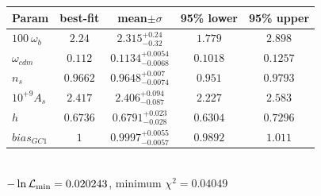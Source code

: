 \begin{tabular}{|l|c|c|c|c|} 
 \hline 
Param & best-fit & mean$\pm\sigma$ & 95\% lower & 95\% upper \\ \hline 
$100~\omega{}_{b }$ &$2.24$ & $2.315_{-0.32}^{+0.24}$ & $1.779$ & $2.898$ \\ 
$\omega{}_{cdm }$ &$0.112$ & $0.1134_{-0.0068}^{+0.0054}$ & $0.1018$ & $0.1257$ \\ 
$n_{s }$ &$0.9662$ & $0.9648_{-0.0074}^{+0.007}$ & $0.951$ & $0.9793$ \\ 
$10^{+9}A_{s }$ &$2.417$ & $2.406_{-0.087}^{+0.094}$ & $2.227$ & $2.583$ \\ 
$h$ &$0.6736$ & $0.6791_{-0.028}^{+0.023}$ & $0.6304$ & $0.7296$ \\ 
$bias_{GC 1 }$ &$1$ & $0.9997_{-0.0057}^{+0.0055}$ & $0.9892$ & $1.011$ \\ 
\hline 
 \end{tabular} \\ 
$-\ln{\cal L}_\mathrm{min} =0.020243$, minimum $\chi^2=0.04049$ \\ 
